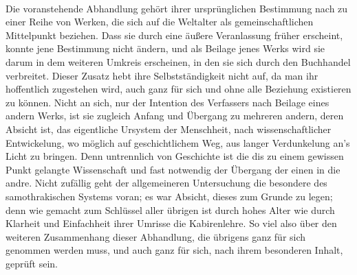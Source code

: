 \documentclass[a4paper, 11pt, oneside]{article}
\begin{document}
\paragraph{}
Die voranstehende Abhandlung gehört ihrer ursprünglichen Bestimmung nach zu einer Reihe von Werken, die sich auf die Weltalter als gemeinschaftlichen Mittelpunkt beziehen. Dass sie durch eine äußere Veranlassung früher erscheint, konnte jene Bestimmung nicht ändern, und als Beilage jenes Werks wird sie darum in dem weiteren Umkreis erscheinen, in den sie sich durch den Buchhandel verbreitet. Dieser Zusatz hebt ihre Selbstständigkeit nicht auf, da man ihr hoffentlich zugestehen wird, auch ganz für sich und ohne alle Beziehung existieren zu können. Nicht an sich, nur der Intention des Verfassers nach Beilage eines andern Werks, ist sie zugleich Anfang und Übergang zu mehreren andern, deren Absicht ist, das eigentliche Ursystem der Menschheit, nach wissenschaftlicher Entwickelung, wo möglich auf geschichtlichem Weg, aus langer Verdunkelung an's Licht zu bringen. Denn untrennlich von Geschichte ist die dis zu einem gewissen Punkt gelangte Wissenschaft und fast notwendig der Übergang der einen in die andre. Nicht zufällig geht der allgemeineren Untersuchung die besondere des samothrakischen Systems voran; es war Absicht, dieses zum Grunde zu legen; denn wie gemacht zum Schlüssel aller übrigen ist durch hohes Alter wie durch Klarheit und Einfachheit ihrer Umrisse die Kabirenlehre. So viel also über den weiteren Zusammenhang dieser Abhandlung, die übrigens ganz für sich genommen werden muss, und auch ganz für sich, nach ihrem besonderen Inhalt, geprüft sein.
\end{document}
